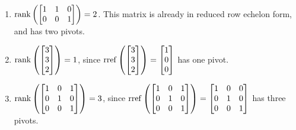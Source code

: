\documentclass{workbook}
\begin{document}
\begin{slide}
\begin{parts}
\begin{solution}
\begin{enumerate}
				\item $\Rank\left(\mat{1&1&0\\0&0&1}\right)=2$.
					This matrix is already in reduced row echelon form, and has two pivots.
				\item $\Rank\left(\mat{3\\3\\2}\right)=1$, since
					$\rref\left(\mat{3\\3\\2}\right)=\mat{1\\0\\0}$ has one pivot.
				\item $\Rank\left(\mat{1&0&1\\0&1&0\\0&0&1}\right)=3$, since
					$\rref\left(\mat{1&0&1\\0&1&0\\0&0&1}\right)=\mat{1&0&0\\0&1&0\\0&0&1}$
					has three pivots.
			\end{enumerate}
		\end{solution}
	\end{parts}

\end{slide}
\end{document}

